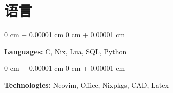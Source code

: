 \documentclass[10pt, letterpaper]{article}
\newenvironment{onecolentry}{
    \begin{adjustwidth}{
        0 cm + 0.00001 cm
    }{
        0 cm + 0.00001 cm
    }
}{
    \end{adjustwidth}
} %
\begin{document}
    
    \section{语言}



        
        \begin{onecolentry}
            \textbf{Languages:}  C, Nix, Lua, SQL, Python
        \end{onecolentry}

        \vspace{0.2 cm}

        \begin{onecolentry}
            \textbf{Technologies:} Neovim, Office,  Nixpkgs, CAD, Latex
        \end{onecolentry}


    
\end{document}
